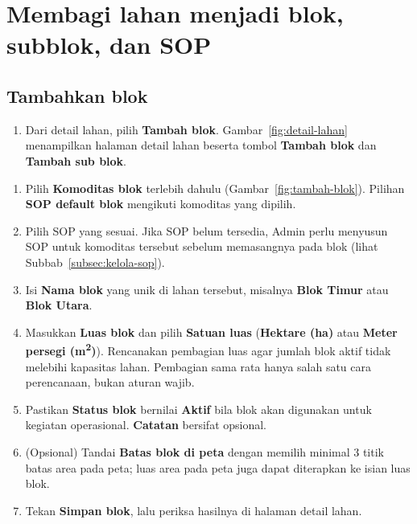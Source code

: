 \section{Membagi lahan menjadi blok, subblok, dan SOP}

\subsection{Tambahkan blok}

\begin{enumerate}[series=admin-blok]
  \item Dari detail lahan, pilih \textbf{Tambah blok}. Gambar~\ref{fig:detail-lahan} menampilkan halaman detail lahan beserta tombol \textbf{Tambah blok} dan \textbf{Tambah sub blok}.
\end{enumerate}


\begin{enumerate}[resume=admin-blok]
  \item Pilih \textbf{Komoditas blok} terlebih dahulu (Gambar~\ref{fig:tambah-blok}). Pilihan \textbf{SOP default blok} mengikuti komoditas yang dipilih.
  \item Pilih SOP yang sesuai. Jika SOP belum tersedia, Admin perlu menyusun SOP untuk komoditas tersebut sebelum memasangnya pada blok (lihat Subbab~\ref{subsec:kelola-sop}).
  \item Isi \textbf{Nama blok} yang unik di lahan tersebut, misalnya \textbf{Blok Timur} atau \textbf{Blok Utara}.
  \item Masukkan \textbf{Luas blok} dan pilih \textbf{Satuan luas} (\textbf{Hektare (ha)} atau \textbf{Meter persegi (m\textsuperscript{2})}). Rencanakan pembagian luas agar jumlah blok aktif tidak melebihi kapasitas lahan. Pembagian sama rata hanya salah satu cara perencanaan, bukan aturan wajib.
  \item Pastikan \textbf{Status blok} bernilai \textbf{Aktif} bila blok akan digunakan untuk kegiatan operasional. \textbf{Catatan} bersifat opsional.
  \item (Opsional) Tandai \textbf{Batas blok di peta} dengan memilih minimal 3 titik batas area pada peta; luas area pada peta juga dapat diterapkan ke isian luas blok.
  \item Tekan \textbf{Simpan blok}, lalu periksa hasilnya di halaman detail lahan.
\end{enumerate}

